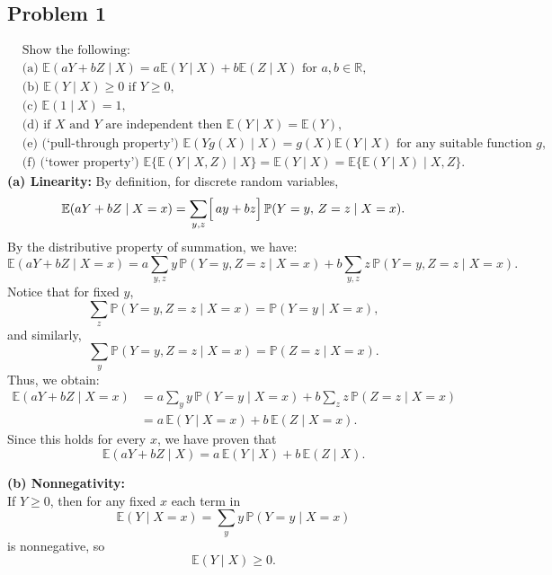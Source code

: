 \documentclass[letterpaper, 11pt]{article}
\newcommand{\1}{\mathds{1}}	%
\theoremstyle{definition}
\begin{document}
\subsection*{Problem 1}
\begin{align*}
    &\text{Show the following:}\\
    &\text{(a) } \mathbb{E}(aY + bZ \mid X) = a\mathbb{E}(Y \mid X) + b\mathbb{E}(Z \mid X) \text{ for } a, b \in \mathbb{R},\\
    &\text{(b) } \mathbb{E}(Y \mid X) \geq 0 \text{ if } Y \geq 0,\\
    &\text{(c) } \mathbb{E}(1 \mid X) = 1,\\
    &\text{(d) } \text{if } X \text{ and } Y \text{ are independent then } \mathbb{E}(Y \mid X) = \mathbb{E}(Y),\\
    &\text{(e) (`pull-through property') } \mathbb{E}(Yg(X) \mid X) = g(X)\mathbb{E}(Y \mid X) \text{ for any suitable function } g,\\
    &\text{(f) (`tower property') } \mathbb{E}\{\mathbb{E}(Y \mid X, Z) \mid X\} = \mathbb{E}(Y \mid X) = \mathbb{E}\{\mathbb{E}(Y \mid X) \mid X, Z\}.
    \end{align*}
    \textbf{(a) Linearity:}  
    By definition, for discrete random variables,
    \[
    \mathbb{E}(aY+bZ \mid X=x)= \sum_{y,z} \Bigl[\,a y+b z\Bigr]\,\mathbb{P}(Y=y,\,Z=z \mid X=x).
    \]
    By the distributive property of summation, we have:
    \[
    \mathbb{E}(aY+bZ \mid X=x)= a \sum_{y,z} y\, \mathbb{P}(Y=y,Z=z \mid X=x)
    + b \sum_{y,z} z\, \mathbb{P}(Y=y,Z=z \mid X=x).
    \]
    Notice that for fixed \(y\),
    \[
    \sum_{z} \mathbb{P}(Y=y, Z=z \mid X=x)= \mathbb{P}(Y=y \mid X=x),
    \]
    and similarly,
    \[
    \sum_{y} \mathbb{P}(Y=y, Z=z \mid X=x)= \mathbb{P}(Z=z \mid X=x).
    \]
    Thus, we obtain:
    \[
    \begin{aligned}
    \mathbb{E}(aY+bZ \mid X=x) &= a \sum_{y} y\, \mathbb{P}(Y=y \mid X=x)
    + b \sum_{z} z\, \mathbb{P}(Z=z \mid X=x)\\[1ex]
    &= a\,\mathbb{E}(Y \mid X=x) + b\,\mathbb{E}(Z \mid X=x).
    \end{aligned}
    \]
    Since this holds for every \(x\), we have proven that
    \[
 {\mathbb{E}(aY+bZ \mid X)= a\,\mathbb{E}(Y \mid X) + b\,\mathbb{E}(Z \mid X).}
    \]
    
    \bigskip
    
    \textbf{(b) Nonnegativity:}\\[1ex]
    If \(Y \geq 0\), then for any fixed \(x\) each term in
    \[
    \mathbb{E}(Y \mid X=x)= \sum_{y} y \, \mathbb{P}(Y=y \mid X=x)
    \]
    is nonnegative, so
    \[
    {\mathbb{E}(Y \mid X) \geq 0.}
    \]
    
\end{document}
